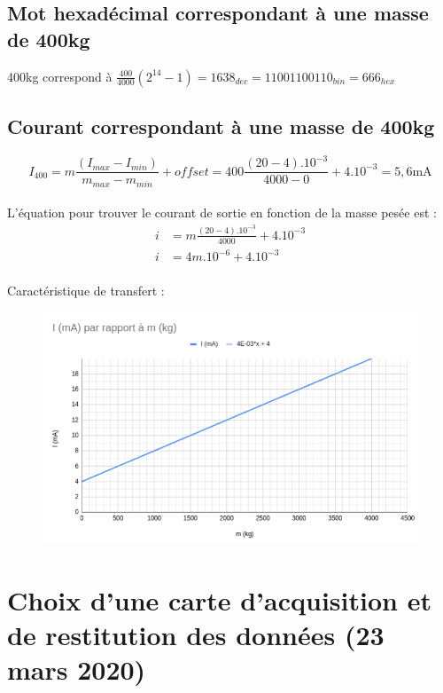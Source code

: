 \documentclass{article}
\begin{document}
\subsection{Mot hexadécimal correspondant à une masse de 400kg}
400kg correspond à $\frac{400}{4000}\left(2^{14} - 1\right) = 1638_{dec} = 110 0110 0110_{bin} = 666_{hex}$

\subsection{Courant correspondant à une masse de 400kg}
$$I_{400} = m\frac{(I_{max} - I_{min})}{m_{max} - m_{min}} + offset = 400\frac{(20-4).10^{-3}}{4000 - 0} + 4.10^{-3} = 5,6\si{\milli\ampere}$$

\paragraph{}
L'équation pour trouver le courant de sortie en fonction de la masse pesée est :
\begin{align*}
    i &= m\frac{(20 - 4).10^{-3}}{4000} + 4.10^{-3}\\
    i &= 4m.10^{-6} + 4.10^{-3}
\end{align*}

\paragraph{}
Caractéristique de transfert :
\begin{figure}[H]
    \centering
    \includegraphics[width=.6\linewidth]{./images/CAN-ex2-caract-transfert.png}
\end{figure}


\newpage
\section{Choix d'une carte d'acquisition et de restitution des données (23 mars 2020)}
\end{document}
